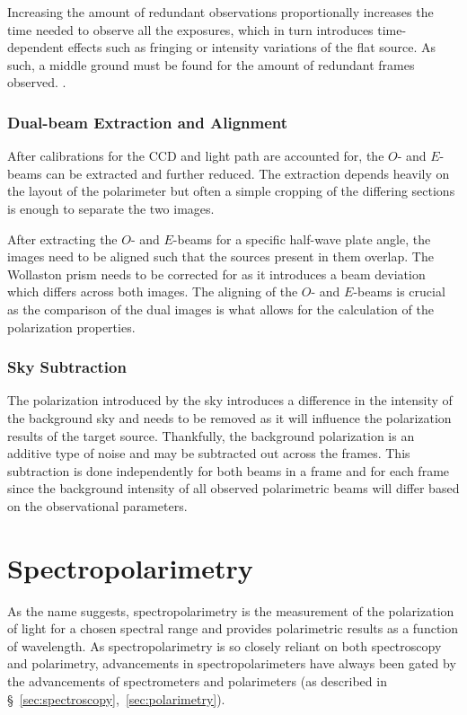 Increasing the amount of redundant observations proportionally increases the time needed to observe all the exposures, which in turn introduces time-dependent effects such as fringing or intensity variations of the flat source. As such, a middle ground must be found for the amount of redundant frames observed. \citep{polarimetry_error, pol_optimize}.

\subsubsection{Dual-beam Extraction and Alignment}\label{subsubsec:pol_oe_extract}

After calibrations for the \gls{CCD} and light path are accounted for, the $O$- and $E$-beams can be extracted and further reduced. The extraction depends heavily on the layout of the polarimeter but often a simple cropping of the differing sections is enough to separate the two images.

After extracting the $O$- and $E$-beams for a specific half-wave plate angle, the images need to be aligned such that the sources present in them overlap. The Wollaston prism needs to be corrected for as it introduces a beam deviation which differs across both images. The aligning of the $O$- and $E$-beams is crucial as the comparison of the dual images is what allows for the calculation of the polarization properties.

\subsubsection{Sky Subtraction}\label{subsubsec:pol_sky_subtract}

The polarization introduced by the sky introduces a difference in the intensity of the background sky and needs to be removed as it will influence the polarization results of the target source. Thankfully, the background polarization is an additive type of noise and may be subtracted out across the frames. This subtraction is done independently for both beams in a frame and for each frame since the background intensity of all observed polarimetric beams will differ based on the observational parameters.

\section{Spectropolarimetry} \label{sec:spectropolarimetry} %

As the name suggests, spectropolarimetry is the measurement of the polarization of light for a chosen spectral range and provides polarimetric results as a function of wavelength. As spectropolarimetry is so closely reliant on both spectroscopy and polarimetry, advancements in spectropolarimeters have always been gated by the advancements of spectrometers and polarimeters (as described in \S~\ref{sec:spectroscopy},~\ref{sec:polarimetry}).

